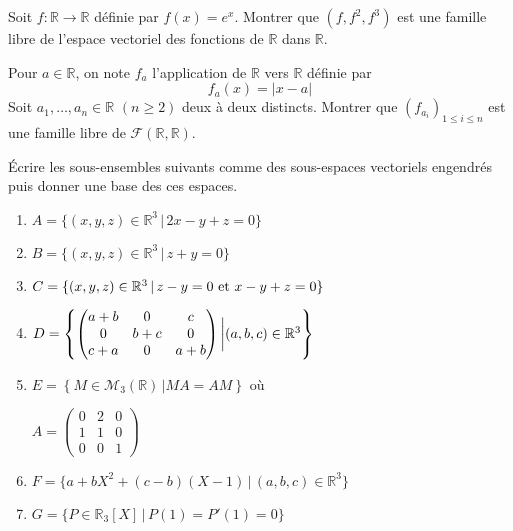 \documentclass[a4paper,twoside,french,11pt]{VcCours}
\begin{document}
\begin{Exercice}{} Soit $f : \mathbb{R} \rightarrow \mathbb{R}$ définie par $f(x)=e^x$. Montrer que $(f,f^2,f^3)$ est une famille libre de l'espace vectoriel des fonctions de $\mathbb{R}$ dans $\mathbb{R}$.
\end{Exercice}

\begin{Exercice}[$\bigstar$] Pour $a \in \mathbb{R}$, on note $f_a$ l'application de $\mathbb{R}$ vers $\mathbb{R}$ définie par 
$$f_a(x) = \vert x - a \vert$$
Soit $a_1, \ldots, a_n \in \mathbb{R}$ $(n \geq 2)$ deux à deux distincts. Montrer que $(f_{a_i})_{1 \leq i \leq n}$ est une famille libre de $\mathcal{F}(\mathbb{R}, \mathbb{R})$.
\end{Exercice} 

\begin{Exercice}{} Écrire les sous-ensembles suivants comme des sous-espaces vectoriels engendrés puis donner une base des ces espaces. 

\begin{multicols}{2}
\begin{enumerate}
\item $A=\lbrace (x,y,z) \in \mathbb{R}^3 \, \vert  \, 2x-y+z=0 \rbrace$
\item $B= \lbrace (x,y,z) \in \mathbb{R}^3 \, \vert \, z+y=0 \rbrace$
\item $C= \lbrace (x,y,z) \in \mathbb{R}^3 \, \vert \, z-y=0 \hbox{ et } x-y+z=0 \rbrace$

\item $D = \left\lbrace \begin{pmatrix}
a+b & 0 & c \\
0 & b+c & 0 \\
c+a & 0& a+b 
\end{pmatrix} \bigg{\vert} (a,b,c) \in \mathbb{R}^3 \right\rbrace$

\columnbreak
\item $E = \left\lbrace M \in \mathcal{M}_3(\mathbb{R}) \,\vert  MA=AM \right\rbrace$ où \newline \begin{center}
$A = \begin{pmatrix}
0 & 2 & 0 \\
1 & 1 & 0 \\
0 & 0 & 1 
\end{pmatrix}$
\end{center}
\item $F= \lbrace a + bX^2 + (c-b)(X-1) \, \vert \, (a,b,c) \in \mathbb{R}^3 \rbrace$
\item $G = \lbrace P \in \mathbb{R}_3[X] \, \vert \, P(1)=P'(1)=0 \rbrace$
\end{enumerate}
\end{multicols}

\vspace{0.05cm}
\end{Exercice}
\end{document}
